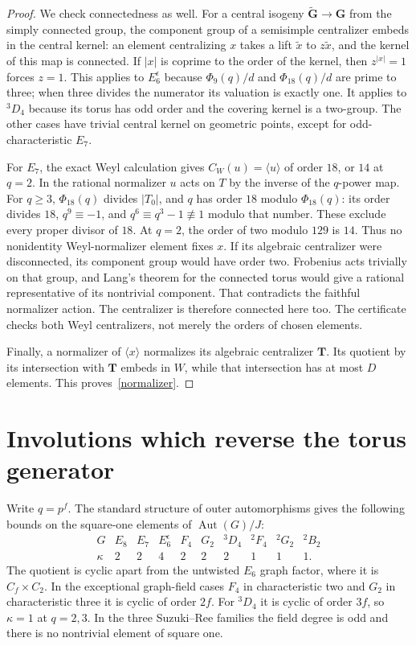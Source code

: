 \documentclass[10pt,a4paper]{article}
\newcommand{\Aut}{\operatorname{Aut}}
\begin{document}
\begin{proof}
We check connectedness as well. For a central isogeny
$\widetilde{\mathbf G}\to\mathbf G$ from the simply connected group,
the component group of a semisimple centralizer embeds in the central
kernel: an element centralizing $x$ takes a lift $\tilde x$ to
$z\tilde x$, and the kernel of this map is connected. If $|x|$ is coprime
to the order of the kernel, then $z^{|x|}=1$ forces $z=1$.
This applies to $E_6^\epsilon$ because $\Phi_9(q)/d$ and
$\Phi_{18}(q)/d$ are prime to three; when three divides the numerator
its valuation is exactly one. It applies to ${}^3D_4$ because its torus
has odd order and the covering kernel is a two-group. The other cases
have trivial central kernel on geometric points, except for odd-characteristic
$E_7$.

For $E_7$, the exact Weyl calculation gives
$C_W(u)=\langle u\rangle$ of order $18$, or $14$ at $q=2$.
In the rational normalizer $u$ acts on $T$ by the inverse of the
$q$-power map. For $q\ge3$, $\Phi_{18}(q)$ divides $|T_0|$, and $q$ has
order $18$ modulo $\Phi_{18}(q)$: its order divides $18$,
$q^9\equiv-1$, and $q^6\equiv q^3-1\not\equiv1$ modulo that number.
These exclude every proper divisor of $18$. At $q=2$, the order of two
modulo $129$ is $14$. Thus no nonidentity Weyl-normalizer element fixes
$x$. If its algebraic centralizer were disconnected, its component group
would have order two. Frobenius acts trivially on that group, and Lang's
theorem for the connected torus would give a rational representative of
its nontrivial component. That contradicts the faithful normalizer action.
The centralizer is therefore connected here too. The certificate checks
both Weyl centralizers, not merely the orders of chosen elements.

Finally, a normalizer of $\langle x\rangle$ normalizes its algebraic
centralizer $\mathbf T$. Its quotient by its intersection with $\mathbf T$
embeds in $W$, while that intersection has at most $D$ elements.
This proves~\eqref{normalizer}.
\end{proof}

\section{Involutions which reverse the torus generator}

Write $q=p^f$. The standard structure of outer automorphisms gives
the following bounds on the square-one elements of $\Aut(G)/J$:
\[
\begin{array}{c|rrrrrrrrr}
G&E_8&E_7&E_6^\epsilon&F_4&G_2&{}^3D_4&{}^2F_4&{}^2G_2&{}^2B_2\\\hline
\kappa&2&2&4&2&2&2&1&1&1.
\end{array}
\]
The quotient is cyclic apart from the untwisted $E_6$ graph factor,
where it is $C_f\times C_2$. In the exceptional graph-field cases
$F_4$ in characteristic two and $G_2$ in characteristic three it is
cyclic of order $2f$. For ${}^3D_4$ it is cyclic of order $3f$, so
$\kappa=1$ at $q=2,3$. In the three Suzuki--Ree families the field
degree is odd and there is no nontrivial element of square one.
\end{document}
